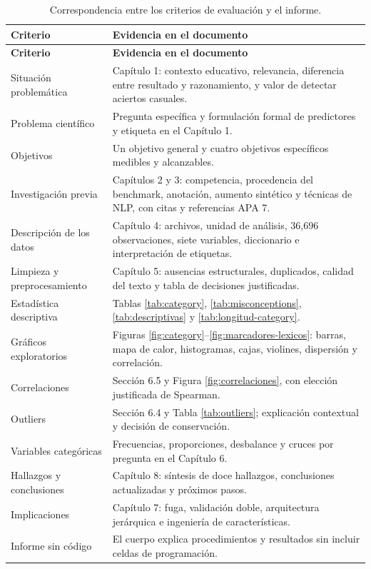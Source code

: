 \documentclass[11pt,oneside,openany]{book}
\begin{document}
\begin{longtable}{@{}p{4.0cm}p{9.8cm}@{}}
\caption{Correspondencia entre los criterios de evaluación y el informe.}
\label{tab:cumplimiento}\\
\toprule
\textbf{Criterio} & \textbf{Evidencia en el documento}\\
\midrule
\endfirsthead
\toprule
\textbf{Criterio} & \textbf{Evidencia en el documento}\\
\midrule
\endhead
\bottomrule
\endlastfoot
Situación problemática & Capítulo 1: contexto educativo, relevancia,
diferencia entre resultado y razonamiento, y valor de detectar aciertos
casuales.\\
Problema científico & Pregunta específica y formulación formal de predictores
y etiqueta en el Capítulo 1.\\
Objetivos & Un objetivo general y cuatro objetivos específicos medibles y
alcanzables.\\
Investigación previa & Capítulos 2 y 3: competencia, procedencia del benchmark,
anotación, aumento sintético y técnicas de NLP, con citas y referencias APA 7.\\
Descripción de los datos & Capítulo 4: archivos, unidad de análisis, 36,696
observaciones, siete variables, diccionario e interpretación de etiquetas.\\
Limpieza y preprocesamiento & Capítulo 5: ausencias estructurales, duplicados,
calidad del texto y tabla de decisiones justificadas.\\
Estadística descriptiva & Tablas \ref{tab:category},
\ref{tab:misconceptions}, \ref{tab:descriptivas} y
\ref{tab:longitud-category}.\\
Gráficos exploratorios & Figuras \ref{fig:category}--\ref{fig:marcadores-lexicos}:
barras, mapa de calor, histogramas, cajas, violines, dispersión y correlación.\\
Correlaciones & Sección 6.5 y Figura \ref{fig:correlaciones}, con elección
justificada de Spearman.\\
Outliers & Sección 6.4 y Tabla \ref{tab:outliers}; explicación contextual y
decisión de conservación.\\
Variables categóricas & Frecuencias, proporciones, desbalance y cruces por
pregunta en el Capítulo 6.\\
Hallazgos y conclusiones & Capítulo 8: síntesis de doce hallazgos, conclusiones
actualizadas y próximos pasos.\\
Implicaciones & Capítulo 7: fuga, validación doble, arquitectura jerárquica e
ingeniería de características.\\
Informe sin código & El cuerpo explica procedimientos y resultados sin incluir
celdas de programación.\\
\end{longtable}
\end{document}
